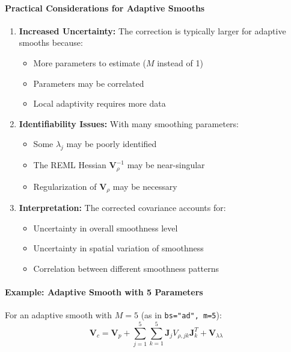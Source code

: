 \documentclass[12pt]{article}
\begin{document}
\paragraph{Practical Considerations for Adaptive Smooths}
\begin{enumerate}
    \item \textbf{Increased Uncertainty:} The correction is typically larger for adaptive smooths because:
    \begin{itemize}
        \item More parameters to estimate ($M$ instead of 1)
        \item Parameters may be correlated
        \item Local adaptivity requires more data
    \end{itemize}
    
    \item \textbf{Identifiability Issues:} With many smoothing parameters:
    \begin{itemize}
        \item Some $\lambda_j$ may be poorly identified
        \item The REML Hessian $\mathbf{V}_\rho^{-1}$ may be near-singular
        \item Regularization of $\mathbf{V}_\rho$ may be necessary
    \end{itemize}
    
    \item \textbf{Interpretation:} The corrected covariance accounts for:
    \begin{itemize}
        \item Uncertainty in overall smoothness level
        \item Uncertainty in spatial variation of smoothness
        \item Correlation between different smoothness patterns
    \end{itemize}
\end{enumerate}

\paragraph{Example: Adaptive Smooth with 5 Parameters}
For an adaptive smooth with $M=5$ (as in \texttt{bs="ad", m=5}):
\begin{equation}
\mathbf{V}_c = \mathbf{V}_p + \sum_{j=1}^5 \sum_{k=1}^5 \mathbf{J}_j V_{\rho,jk} \mathbf{J}_k^T + \mathbf{V}_{\lambda\lambda}
\end{equation}
\end{document}
